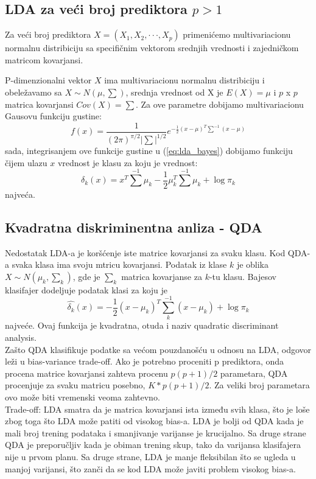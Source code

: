 \subsection{LDA za veći broj prediktora $p > 1$}

Za veći broj prediktora $X = (X_1, X_2, \cdot\cdot\cdot, X_p)$ primenićemo
multivariacionu normalnu distribiciju sa specifičnim vektorom srednjih vrednosti
i zajedničkom matricom kovarjansi.

P-dimenzionalni vektor $X$ ima multivariacionu normalnu distribiciju i obeležavamo
sa $X \sim N(\mu, \sum)$, srednja vrednost od X je $E(X)=\mu$ i $p$ x $p$ matrica
kovarjansi $Cov(X)=\sum$. Za ove parametre dobijamo multivariacionu Gausovu funkciju gustine:
\begin{equation} \label{eq:lda_multi_var_gauss_density}
  f(x) =
  \frac{1}{(2\pi)^{\pi/2}|\sum|^{1/2}}
  e^{-\frac{1}{2}(x-\mu)^T\sum^{-1}(x-\mu)}
\end{equation}
sada, integrisanjem ove funkcije gustine u (\ref{eq:lda_bayes}) dobijamo funkciju
čijem ulazu $x$ vrednost je klasu za koju je vrednost:
\begin{equation} \label{}
  \delta_k\left(x\right) =
    x^T\sum^{-1}\mu_k -\frac{1}{2}\mu_k^T\sum^{-1}\mu_k + \log{\pi_k}
\end{equation}
najveća.

\subsection{Kvadratna diskriminentna anliza - QDA}

Nedostatak LDA-a je koršćenje iste matrice kovarjansi za svaku klasu. Kod QDA-a
svaka klasa ima svoju mtricu kovarjansi.  Podatak iz klase $k$ je oblika
$X \sim N\left(\mu_k, \sum_k\right)$, gde je $\sum_k$ matrica kovarjanse za
$k$-tu klasu. Bajesov klasifajer dodeljuje podatak klasi za koju je
\begin{equation}
  \hat{\delta_k}\left(x\right) =
  -\frac{1}{2}(x-\mu_k)^T\sum_{k}^{-1}(x-\mu_k)+\log{\pi_k}
\end{equation}
najveće. Ovaj funkcija je kvadratna, otuda i naziv quadratic discriminant
analysis. \\

Zašto QDA klasifikuje podatke sa većom pouzdanošću u odnosu na LDA, odgovor leži
u bias-variance trade-off. Ako je potrebno proceniti p prediktora, onda procena
matrice kovarjansi zahteva procenu $p(p+1)/2$ parametara, QDA procenjuje za svaku
matricu posebno, $K*p(p+1)/2$. Za veliki broj parametara ovo može biti vremenski
veoma zahtevno. \\

Trade-off: LDA smatra da je matrica kovarjansi ista između svih klasa, što je
loše zbog toga što LDA može patiti od visokog bias-a. LDA je bolji od QDA kada je
mali broj trening podataka i smanjivanje varijanse je krucijalno. Sa druge strane
QDA je preporučljiv kada je obiman trening skup, tako da varijansa klasifajera
nije u prvom planu.
Sa druge strane, LDA je manje fleksibilan što se ugleda u manjoj
varijansi, što zanči da se kod LDA može javiti problem visokog bias-a.
